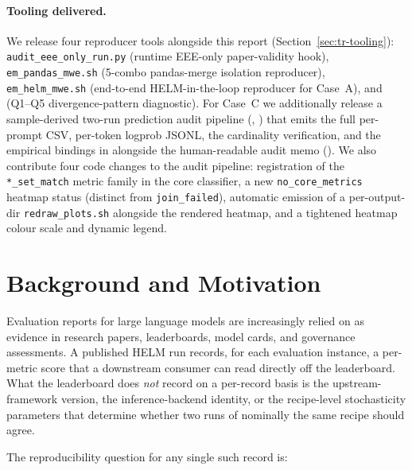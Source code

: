 \documentclass[11pt]{article}
\begin{document}
\paragraph{Tooling delivered.}
We release four reproducer tools alongside this report
  (Section~\ref{sec:tr-tooling}):
  \texttt{audit\_eee\_only\_run.py} (runtime EEE-only paper-validity
  hook),
  \texttt{em\_pandas\_mwe.sh} (5-combo pandas-merge isolation
  reproducer),
  \texttt{em\_helm\_mwe.sh} (end-to-end HELM-in-the-loop reproducer
  for Case~A),
  and  (Q1--Q5
  divergence-pattern diagnostic).
For Case~C we additionally release a sample-derived two-run
  prediction audit pipeline
  (,
  ) that emits the
  full per-prompt CSV, per-token logprob JSONL, the cardinality
  verification, and the empirical bindings in
   alongside the human-readable
  audit memo
  ().
We also contribute four code changes to the audit pipeline:
  registration of the \texttt{*\_set\_match} metric family in the core
  classifier, a new \texttt{no\_core\_metrics} heatmap status
  (distinct from \texttt{join\_failed}), automatic emission of a
  per-output-dir \texttt{redraw\_plots.sh} alongside the rendered
  heatmap, and a tightened heatmap colour scale and dynamic legend.


\section{Background and Motivation}
\label{sec:tr-background}

Evaluation reports for large language models are increasingly relied
  on as evidence in research papers, leaderboards, model cards, and
  governance assessments.
A published HELM run records, for each evaluation instance, a
  per-metric score that a downstream consumer can read directly off
  the leaderboard.
What the leaderboard does \emph{not} record on a per-record basis is
  the upstream-framework version, the inference-backend identity, or
  the recipe-level stochasticity parameters that determine whether
  two runs of nominally the same recipe should agree.

The reproducibility question for any single such record is:
\end{document}
